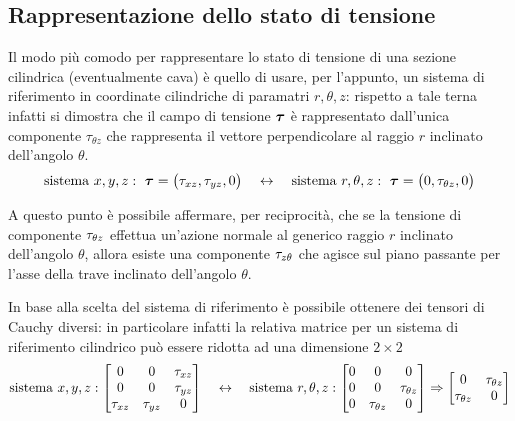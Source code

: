     \subsection{Rappresentazione dello stato di tensione}
    	Il modo più comodo per rappresentare lo stato di tensione di una sezione cilindrica (eventualmente cava) è quello di usare, per l'appunto, un sistema di riferimento in coordinate cilindriche di paramatri $r,\theta,z$: rispetto a tale terna infatti si dimostra che il campo di tensione $\boldsymbol{\tau}$ è rappresentato dall'unica componente $\tau_{\theta z}$ che rappresenta il vettore perpendicolare al raggio $r$ inclinato dell'angolo $\theta$.
    	\[ \textrm{sistema } x,y,z: \ \boldsymbol{\tau} = \big(\tau_{xz}, \tau_{yz},0\big) \quad \leftrightarrow \quad \textrm{sistema } r,\theta,z: \ \boldsymbol{\tau} = \big(0, \tau_{\theta z},0\big)  \]	
    	
    	A questo punto è possibile affermare, per reciprocità, che se la tensione di componente $\tau_{\theta z}$ effettua un'azione normale al generico raggio $r$ inclinato dell'angolo $\theta$, allora esiste una componente $\tau_{z \theta}$ che agisce sul piano passante per l'asse della trave inclinato dell'angolo $\theta$.
    	
    	
    	In base alla scelta del sistema di riferimento è possibile ottenere dei tensori di Cauchy diversi: in particolare infatti la relativa matrice per un sistema di riferimento cilindrico può essere ridotta ad una dimensione $2\times 2$
    	\[ \textrm{sistema } x,y,z: \begin{bmatrix}
    		0 & 0 & \tau_{xz} \\ 0 & 0 & \tau_{yz} \\ \tau_{xz} & \tau_{yz} & 0
    	\end{bmatrix} \quad \leftrightarrow \quad \textrm{sistema } r,\theta,z: \begin{bmatrix}
    		0 & 0 & 0 \\ 0 & 0 & \tau_{\theta z} \\ 0 & \tau_{\theta z} & 0 
    	\end{bmatrix} \Rightarrow \begin{bmatrix}
    		0 & \tau_{\theta z} \\ \tau_{\theta z} & 0
    	\end{bmatrix} \]	
    
    	
